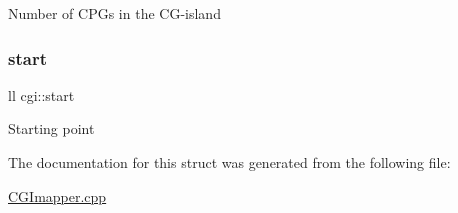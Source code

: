 Number of C\+P\+Gs in the C\+G-\/island \mbox{\label{structcgi_ab5f8ab596a841ac196d8b653ff67ab03}} 
\subsubsection{\texorpdfstring{start}{start}}
{\footnotesize\ttfamily ll cgi\+::start}

Starting point 

The documentation for this struct was generated from the following file\+:\begin{DoxyCompactItemize}
\item 
\hyperlink{CGImapper_8cpp}{C\+G\+Imapper.\+cpp}\end{DoxyCompactItemize}
